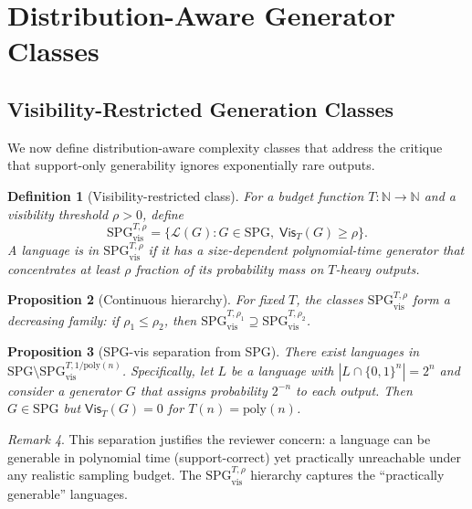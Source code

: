 \documentclass[11pt]{article}
\newcommand{\SPG}{\text{SPG}}
\newcommand{\SPGvis}[2]{\mathrm{SPG}_{\mathrm{vis}}^{#1,#2}}
\newtheorem{definition}{Definition}[section]
\newtheorem{proposition}[definition]{Proposition}
\theoremstyle{remark}
\newtheorem{remark}[definition]{Remark}
\theoremstyle{definition}
\begin{document}

\section{Distribution-Aware Generator Classes}\label{sec:distribution-aware}

\subsection{Visibility-Restricted Generation Classes}\label{sec:vis-classes}

We now define distribution-aware complexity classes that address the critique
that support-only generability ignores exponentially rare outputs.

\begin{definition}[Visibility-restricted class]
For a budget function $T : \mathbb{N} \to \mathbb{N}$ and a visibility
threshold $\rho > 0$, define
\[
\SPGvis{T}{\rho} = \{ \mathcal{L}(G) : G \in \SPG{},\;
\mathsf{Vis}_T(G) \ge \rho \}.
\]
A language is in $\SPGvis{T}{\rho}$ if it has a size-dependent polynomial-time
generator that concentrates at least $\rho$ fraction of its probability mass on
$T$-heavy outputs.
\end{definition}

\begin{proposition}[Continuous hierarchy]
For fixed $T$, the classes $\SPGvis{T}{\rho}$ form a decreasing family:
if $\rho_1 \le \rho_2$, then
$\SPGvis{T}{\rho_1} \supseteq \SPGvis{T}{\rho_2}$.
\end{proposition}

\begin{proposition}[SPG-vis separation from SPG]\label{prop:spg-vis-separation}
There exist languages in $\SPG{} \setminus \SPGvis{T}{1/\mathrm{poly}(n)}$.
Specifically, let $L$ be a language with $|L \cap \{0,1\}^n| = 2^n$ and consider
a generator $G$ that assigns probability $2^{-n}$ to each output.  Then
$G \in \SPG{}$ but $\mathsf{Vis}_T(G) = 0$ for $T(n) = \mathrm{poly}(n)$.
\end{proposition}

\begin{remark}
This separation justifies the reviewer concern: a language can be
generable in polynomial time (support-correct) yet practically unreachable
under any realistic sampling budget.  The $\SPGvis{T}{\rho}$ hierarchy
captures the ``practically generable'' languages.
\end{remark}
\end{document}
